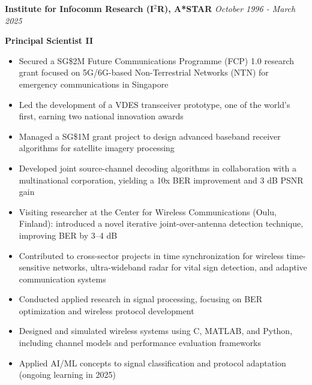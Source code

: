 \documentclass[a4paper, 11pt]{article}
\begin{document}
	\vspace{3pt}
		
	{\large \bf Institute for Infocomm Research (I$^{2}$R), A*STAR} \hfill {\large \it October 1996 - March 2025} 
		
	\vspace{3pt}
		
	{\raggedleft \large \bf Principal Scientist II}
		
	\vspace{3pt}
		
	\begin{itemize}[leftmargin=*, itemsep=-1mm]
			
		\item Secured a SG\$2M Future Communications Programme (FCP) 1.0 research grant focused on 5G/6G-based Non-Terrestrial Networks (NTN) for emergency communications in Singapore 
		
		\item Led the development of a VDES transceiver prototype, one of the world’s first, earning two national innovation awards
		
		\item Managed a SG\$1M grant project to design advanced baseband receiver algorithms for satellite imagery processing
		
		\item Developed joint source-channel decoding algorithms in collaboration with a multinational corporation, yielding a 10x BER improvement and 3 dB PSNR gain
		
		\item Visiting researcher at the Center for Wireless Communications (Oulu, Finland): introduced a novel iterative joint-over-antenna detection technique, improving BER by 3–4 dB
		
		\item Contributed to cross-sector projects in time synchronization for wireless time-sensitive networks, ultra-wideband radar for vital sign detection, and adaptive communication systems
		
		\item Conducted applied research in signal processing, focusing on BER optimization and wireless protocol development
		
		\item Designed and simulated wireless systems using C, MATLAB, and Python, including channel models and performance evaluation frameworks
		
		\item Applied AI/ML concepts to signal classification and protocol adaptation (ongoing learning in 2025)
			
	\end{itemize}
		
\end{document}
